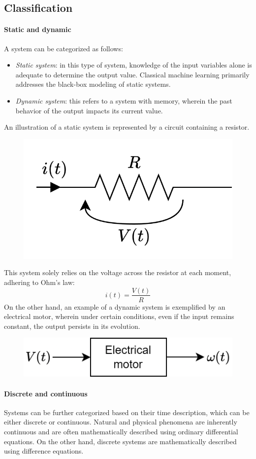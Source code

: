 \subsection{Classification}
\paragraph*{Static and dynamic}
A system can be categorized as follows:
\begin{itemize}
    \item \textit{Static system}: in this type of system, knowledge of the input variables alone is adequate to determine the output value.
        Classical machine learning primarily addresses the black-box modeling of static systems.
    \item \textit{Dynamic system}: this refers to a system with memory, wherein the past behavior of the output impacts its current value.
\end{itemize}

\begin{example}
    An illustration of a static system is represented by a circuit containing a resistor.
    \begin{figure}[H]
        \centering
        \includegraphics[width=0.35\linewidth]{images/resistor.png}
    \end{figure}
    This system solely relies on the voltage across the resistor at each moment, adhering to Ohm's law:
    \[i(t)=\dfrac{V(t)}{R}\]
    On the other hand, an example of a dynamic system is exemplified by an electrical motor, wherein under certain conditions, even if the input remains constant, the output persists in its evolution.
    \begin{figure}[H]
        \centering
        \includegraphics[width=0.5\linewidth]{images/motor.png}
    \end{figure}
\end{example}

\paragraph*{Discrete and continuous}
Systems can be further categorized based on their time description, which can be either discrete or continuous.
Natural and physical phenomena are inherently continuous and are often mathematically described using ordinary differential equations.
On the other hand, discrete systems are mathematically described using difference equations.

